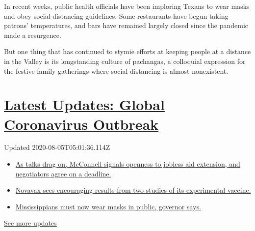 In recent weeks, public health officials have been imploring Texans to
wear masks and obey social-distancing guidelines. Some restaurants have
begun taking patrons' temperatures, and bars have remained largely
closed since the pandemic made a resurgence.

But one thing that has continued to stymie efforts at keeping people at
a distance in the Valley is its longstanding culture of pachangas, a
colloquial expression for the festive family gatherings where social
distancing is almost nonexistent.

\hypertarget{latest-updates-global-coronavirus-outbreak}{%
\section{\texorpdfstring{\href{https://www.nytimes.com/2020/08/04/world/coronavirus-cases.html?action=click\&pgtype=Article\&state=default\&region=MAIN_CONTENT_1\&context=storylines_live_updates}{Latest
Updates: Global Coronavirus
Outbreak}}{Latest Updates: Global Coronavirus Outbreak}}\label{latest-updates-global-coronavirus-outbreak}}

Updated 2020-08-05T05:01:36.114Z

\begin{itemize}
\tightlist
\item
  \href{https://www.nytimes.com/2020/08/04/world/coronavirus-cases.html?action=click\&pgtype=Article\&state=default\&region=MAIN_CONTENT_1\&context=storylines_live_updates\#link-762df92}{As
  talks drag on, McConnell signals openness to jobless aid extension,
  and negotiators agree on a deadline.}
\item
  \href{https://www.nytimes.com/2020/08/04/world/coronavirus-cases.html?action=click\&pgtype=Article\&state=default\&region=MAIN_CONTENT_1\&context=storylines_live_updates\#link-1228a480}{Novavax
  sees encouraging results from two studies of its experimental
  vaccine.}
\item
  \href{https://www.nytimes.com/2020/08/04/world/coronavirus-cases.html?action=click\&pgtype=Article\&state=default\&region=MAIN_CONTENT_1\&context=storylines_live_updates\#link-794484ed}{Mississippians
  must now wear masks in public, governor says.}
\end{itemize}

\href{https://www.nytimes.com/2020/08/04/world/coronavirus-cases.html?action=click\&pgtype=Article\&state=default\&region=MAIN_CONTENT_1\&context=storylines_live_updates}{See
more updates}

